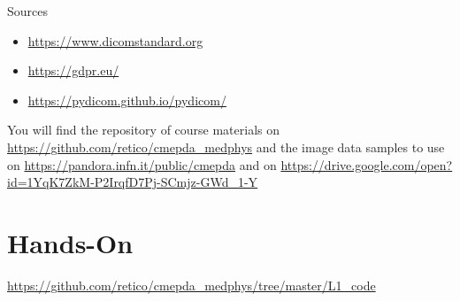 Sources
\begin{itemize}
	\item \url{https://www.dicomstandard.org}
	\item \url{https://gdpr.eu/}
	\item\url{https://pydicom.github.io/pydicom/}
\end{itemize}

You will find the repository of course materials on \url{https://github.com/retico/cmepda_medphys}
and the image data samples to use on \url{https://pandora.infn.it/public/cmepda}
and on \url{https://drive.google.com/open?id=1YqK7ZkM-P2IrqfD7Pj-SCmjz-GWd_1-Y}

\section{Hands-On}

\url{https://github.com/retico/cmepda_medphys/tree/master/L1_code}